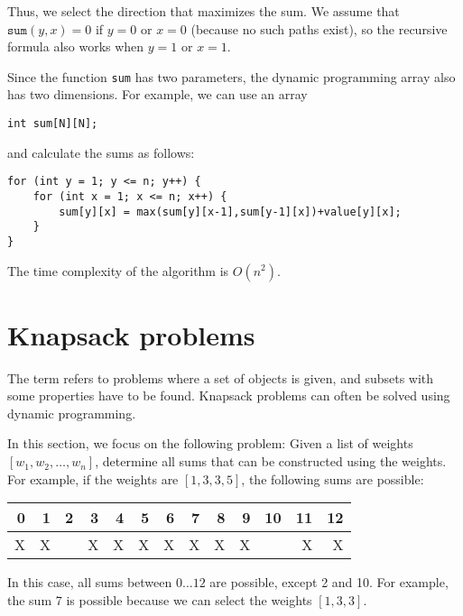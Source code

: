 Thus, we select the direction that maximizes
the sum.
We assume that $\texttt{sum}(y,x)=0$
if $y=0$ or $x=0$ (because no such paths exist),
so the recursive formula also works when $y=1$ or $x=1$.

Since the function \texttt{sum} has two parameters,
the dynamic programming array also has two dimensions.
For example, we can use an array
\begin{lstlisting}
int sum[N][N];
\end{lstlisting}
and calculate the sums as follows:
\begin{lstlisting}
for (int y = 1; y <= n; y++) {
    for (int x = 1; x <= n; x++) {
        sum[y][x] = max(sum[y][x-1],sum[y-1][x])+value[y][x];
    }
}
\end{lstlisting}
The time complexity of the algorithm is $O(n^2)$.

\section{Knapsack problems}


The term  refers to problems where
a set of objects is given, and 
subsets with some properties
have to be found.
Knapsack problems can often be solved
using dynamic programming.

In this section, we focus on the following
problem: Given a list of weights
$[w_1,w_2,\ldots,w_n]$,
determine all
sums that can be constructed using the weights.
For example, if the weights are
$[1,3,3,5]$, the following sums are possible:

\begin{center}
\begin{tabular}{rrrrrrrrrrrrr}
 0 & 1 & 2 & 3 & 4 & 5 & 6 & 7 & 8 & 9 & 10 & 11 & 12 \\
\hline
 X & X & & X & X & X & X & X & X & X & & X & X \\
\end{tabular}
\end{center}

In this case, all sums between $0 \ldots 12$
are possible, except 2 and 10.
For example, the sum 7 is possible because we
can select the weights $[1,3,3]$.

